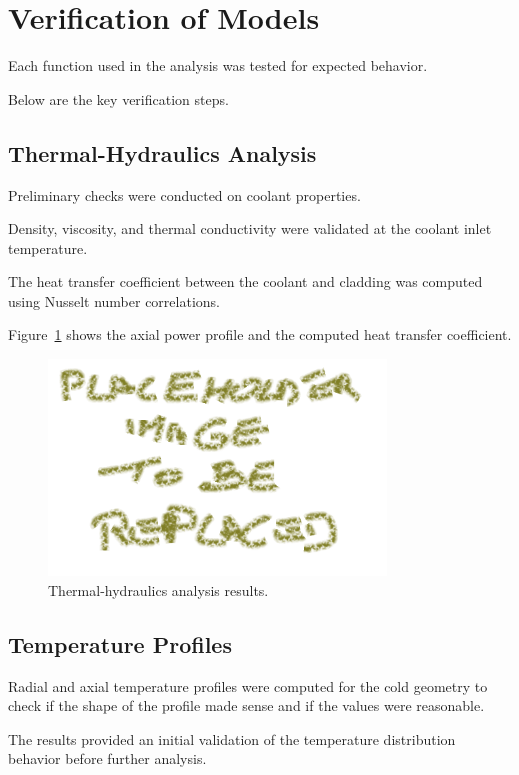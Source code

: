 
\section{Verification of Models}
Each function used in the analysis was tested for expected behavior.

Below are the key verification steps.

\subsection{Thermal-Hydraulics Analysis}
Preliminary checks were conducted on coolant properties.

Density, viscosity, and thermal conductivity were validated at the coolant inlet temperature.

The heat transfer coefficient between the coolant and cladding was computed using Nusselt number correlations.

Figure~\ref{fig:thermal_hydraulics} shows the axial power profile and the computed heat transfer coefficient.

\begin{figure}[H]
\centering
\includegraphics[width=0.8\textwidth]{placeholder.png}
\caption{Thermal-hydraulics analysis results.}
\label{fig:thermal_hydraulics}
\end{figure}

\subsection{Temperature Profiles}
Radial and axial temperature profiles were computed for the cold geometry to check if the shape of the profile made sense and if the values were reasonable.

The results provided an initial validation of the temperature distribution behavior before further analysis.

